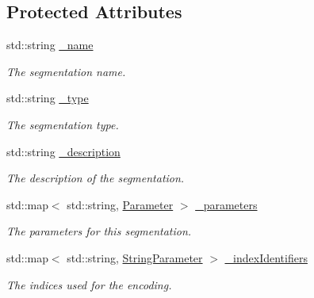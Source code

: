 \subsection*{Protected Attributes}
\begin{DoxyCompactItemize}
\item 
std::string \hyperlink{class_d_d4hep_1_1_d_d_segmentation_1_1_segmentation_aa129e659e465d9a0a60c7160d29de483}{\_\-name}
\begin{DoxyCompactList}\small\item\em The segmentation name. \item\end{DoxyCompactList}\item 
std::string \hyperlink{class_d_d4hep_1_1_d_d_segmentation_1_1_segmentation_a3dab8fc421e90851cc45b20b90754271}{\_\-type}
\begin{DoxyCompactList}\small\item\em The segmentation type. \item\end{DoxyCompactList}\item 
std::string \hyperlink{class_d_d4hep_1_1_d_d_segmentation_1_1_segmentation_a1e9aa1272b32dc4999584154baa72a14}{\_\-description}
\begin{DoxyCompactList}\small\item\em The description of the segmentation. \item\end{DoxyCompactList}\item 
std::map$<$ std::string, \hyperlink{class_d_d4hep_1_1_d_d_segmentation_1_1_segmentation_parameter}{Parameter} $>$ \hyperlink{class_d_d4hep_1_1_d_d_segmentation_1_1_segmentation_a7ede8a80772ee04c5997696734f0c200}{\_\-parameters}
\begin{DoxyCompactList}\small\item\em The parameters for this segmentation. \item\end{DoxyCompactList}\item 
std::map$<$ std::string, \hyperlink{class_d_d4hep_1_1_d_d_segmentation_1_1_typed_segmentation_parameter}{StringParameter} $>$ \hyperlink{class_d_d4hep_1_1_d_d_segmentation_1_1_segmentation_a55ce2740cffa420bb5ac2b7646e55d98}{\_\-indexIdentifiers}
\begin{DoxyCompactList}\small\item\em The indices used for the encoding. \item\end{DoxyCompactList}\item 

\end{DoxyCompactItemize}
